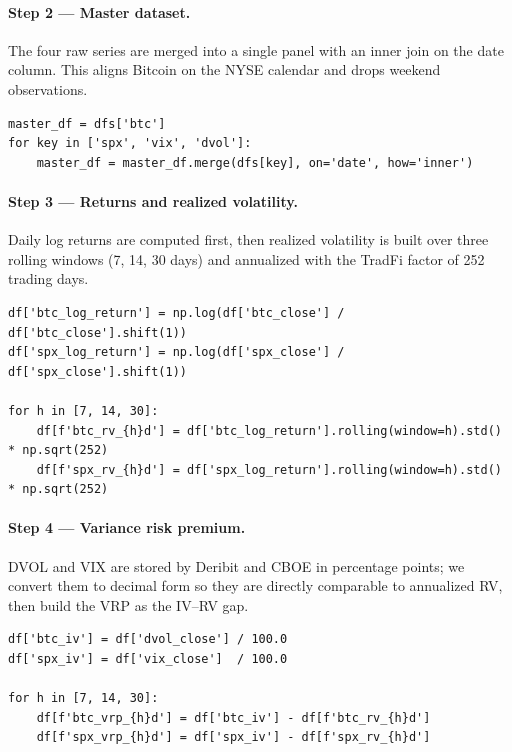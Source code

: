 \documentclass[11pt,a4paper,openany]{report}
\begin{document}
\paragraph{Step 2 --- Master dataset.} The four raw series are merged
into a single panel with an inner join on the date column. This aligns
Bitcoin on the NYSE calendar and drops weekend observations.

\begin{lstlisting}[caption={Inner-join merge (\texttt{src/processing/build\_master\_dataset.py})}]
master_df = dfs['btc']
for key in ['spx', 'vix', 'dvol']:
    master_df = master_df.merge(dfs[key], on='date', how='inner')
\end{lstlisting}

\paragraph{Step 3 --- Returns and realized volatility.} Daily log
returns are computed first, then realized volatility is built over
three rolling windows (7, 14, 30 days) and annualized with the
TradFi factor of 252 trading days.

\begin{lstlisting}[caption={Log returns and rolling realized volatility (\texttt{src/processing/realized\_vol.py})}]
df['btc_log_return'] = np.log(df['btc_close'] / df['btc_close'].shift(1))
df['spx_log_return'] = np.log(df['spx_close'] / df['spx_close'].shift(1))

for h in [7, 14, 30]:
    df[f'btc_rv_{h}d'] = df['btc_log_return'].rolling(window=h).std() * np.sqrt(252)
    df[f'spx_rv_{h}d'] = df['spx_log_return'].rolling(window=h).std() * np.sqrt(252)
\end{lstlisting}

\paragraph{Step 4 --- Variance risk premium.} DVOL and VIX are stored
by Deribit and CBOE in percentage points; we convert them to decimal
form so they are directly comparable to annualized RV, then build the
VRP as the IV--RV gap.

\begin{lstlisting}[caption={Percentage to decimal conversion and VRP construction (\texttt{src/processing/vrp.py})}]
df['btc_iv'] = df['dvol_close'] / 100.0
df['spx_iv'] = df['vix_close']  / 100.0

for h in [7, 14, 30]:
    df[f'btc_vrp_{h}d'] = df['btc_iv'] - df[f'btc_rv_{h}d']
    df[f'spx_vrp_{h}d'] = df['spx_iv'] - df[f'spx_rv_{h}d']
\end{lstlisting}
\end{document}
